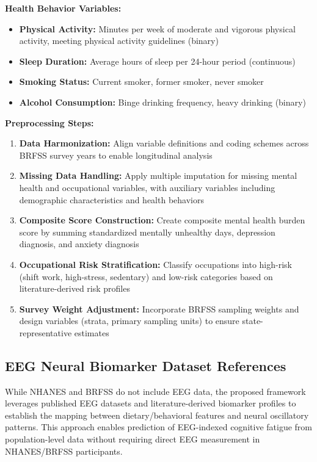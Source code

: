 \documentclass[journal,twoside,10pt]{IEEEtran}
\begin{document}
\textbf{Health Behavior Variables:}
\begin{itemize}
\item \textbf{Physical Activity:} Minutes per week of moderate and vigorous physical activity, meeting physical activity guidelines (binary)
\item \textbf{Sleep Duration:} Average hours of sleep per 24-hour period (continuous)
\item \textbf{Smoking Status:} Current smoker, former smoker, never smoker
\item \textbf{Alcohol Consumption:} Binge drinking frequency, heavy drinking (binary)
\end{itemize}

\textbf{Preprocessing Steps:}
\begin{enumerate}
\item \textbf{Data Harmonization:} Align variable definitions and coding schemes across BRFSS survey years to enable longitudinal analysis
\item \textbf{Missing Data Handling:} Apply multiple imputation for missing mental health and occupational variables, with auxiliary variables including demographic characteristics and health behaviors
\item \textbf{Composite Score Construction:} Create composite mental health burden score by summing standardized mentally unhealthy days, depression diagnosis, and anxiety diagnosis
\item \textbf{Occupational Risk Stratification:} Classify occupations into high-risk (shift work, high-stress, sedentary) and low-risk categories based on literature-derived risk profiles
\item \textbf{Survey Weight Adjustment:} Incorporate BRFSS sampling weights and design variables (strata, primary sampling units) to ensure state-representative estimates
\end{enumerate}

\subsection{EEG Neural Biomarker Dataset References}

While NHANES and BRFSS do not include EEG data, the proposed framework leverages published EEG datasets and literature-derived biomarker profiles to establish the mapping between dietary/behavioral features and neural oscillatory patterns. This approach enables prediction of EEG-indexed cognitive fatigue from population-level data without requiring direct EEG measurement in NHANES/BRFSS participants.
\end{document}
